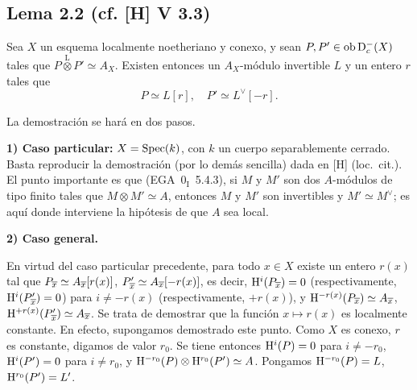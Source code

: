 \subsection*{Lema 2.2 (cf. [H] V 3.3)}
Sea $X$ un esquema localmente noetheriano y conexo, y sean $P, P' \in \operatorname{ob} \mathrm{D}_c^{-}(X)$ tales que $P \mathop{\otimes}\limits^{\mathrm{L}} P' \simeq A_X$. Existen entonces un $A_X$-módulo invertible $L$ y un entero $r$ tales que
\[
P \simeq L[r], \quad P' \simeq L^{\vee}[-r].
\]

La demostración se hará en dos pasos.

\textbf{1) Caso particular:} $X = \operatorname{Spec}(k)$, con $k$ un cuerpo separablemente cerrado. Basta reproducir la demostración (por lo demás sencilla) dada en [H] (loc.~cit.). El punto importante es que (EGA~$0_{\mathrm{I}}$~5.4.3), si $M$ y $M'$ son dos $A$-módulos de tipo finito tales que $M \otimes M' \simeq A$, entonces $M$ y $M'$ son invertibles y $M' \simeq M^{\vee}$; es aquí donde interviene la hipótesis de que $A$ sea local.

\textbf{2) Caso general.}

En virtud del caso particular precedente, para todo $x \in X$ existe un entero $r(x)$ tal que $P_{\overline{x}} \simeq A_{\overline{x}}[r(x)]$, $P'_{\overline{x}} \simeq A_{\overline{x}}[-r(x)]$, es decir, $\mathrm{H}^i(P_{\overline{x}}) = 0$ (respectivamente, $\mathrm{H}^i(P'_{\overline{x}}) = 0$) para $i \neq -r(x)$ (respectivamente, $+r(x)$), y $\mathrm{H}^{-r(x)}(P_{\overline{x}}) \simeq A_{\overline{x}}$, $\mathrm{H}^{+r(x)}(P'_{\overline{x}}) \simeq A_{\overline{x}}$. Se trata de demostrar que la función $x \mapsto r(x)$ es localmente constante. En efecto, supongamos demostrado este punto. Como $X$ es conexo, $r$ es constante, digamos de valor $r_0$. Se tiene entonces $\mathrm{H}^i(P) = 0$ para $i \neq -r_0$, $\mathrm{H}^i(P') = 0$ para $i \neq r_0$, y $\mathrm{H}^{-r_0}(P) \otimes \mathrm{H}^{r_0}(P') \simeq A$. Pongamos $\mathrm{H}^{-r_0}(P) = L$, $\mathrm{H}^{r_0}(P') = L'$.


